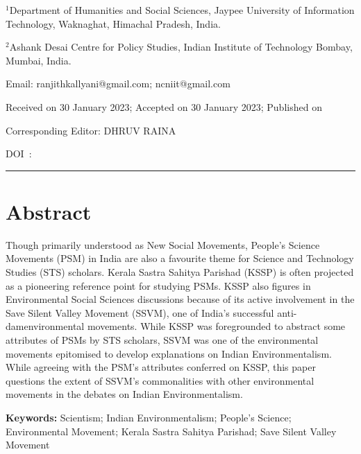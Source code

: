 \documentclass[twoside, 13pt]{article}
\begin{document}


\maketitle
  
\chead[]{}{}


\noindent



\vspace{-.5cm}

{\fontsize{14}{16}\selectfont
$^{1}$Department of Humanities and Social Sciences, Jaypee University of Information Technology, Waknaghat, Himachal Pradesh, India.
       
$^{2}$Ashank Desai Centre for Policy Studies, Indian Institute of Technology Bombay, Mumbai, India.

Email: ranjithkallyani@gmail.com; ncniit@gmail.com 

\vspace{.3cm}

Received on 30 January 2023; Accepted on 30 January 2023; Published on

\vspace{.3cm}

Corresponding Editor: DHRUV RAINA

\vspace{.3cm}

DOI~:

}
\noindent\rule{\textwidth}{0.2mm}


\vspace{-.7cm}


{\fontsize{18}{20}\selectfont \section*{Abstract}}

\vspace{-.4cm}
{\renewcommand\theparagraph    {\thesubsubsection.\@Linux Libertine\c@paragraph}}
{\fontsize{12}{14}\selectfont Though primarily understood as New Social Movements, People’s Science Movements (PSM) in India are also a favourite theme for Science and Technology Studies (STS) scholars. Kerala Sastra Sahitya Parishad (KSSP) is often projected as a pioneering reference point for studying PSMs. KSSP also figures in Environmental Social Sciences discussions because of its active involvement in the Save Silent Valley Movement (SSVM), one of India's successful anti-damenvironmental movements. While KSSP was foregrounded to abstract some attributes of PSMs by STS scholars, SSVM was one of the environmental movements epitomised to develop explanations on Indian Environmentalism. While agreeing with the PSM’s attributes conferred on KSSP, this paper questions the extent of SSVM’s commonalities with other environmental movements in the debates on Indian Environmentalism. 

\vspace{.2cm}

{\bfseries Keywords:} Scientism; Indian Environmentalism; People’s Science; Environmental Movement; Kerala Sastra Sahitya Parishad; Save Silent Valley Movement}
\end{document}
